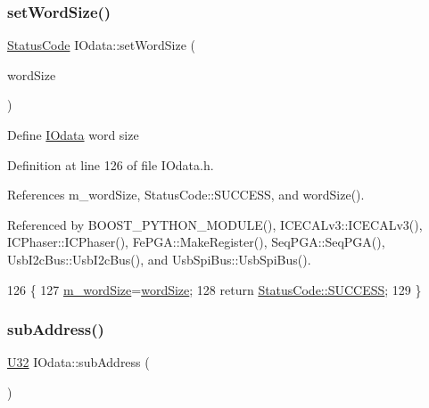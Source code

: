 \subsubsection{\texorpdfstring{set\+Word\+Size()}{setWordSize()}}
{\footnotesize\ttfamily \hyperlink{classStatusCode}{Status\+Code} I\+Odata\+::set\+Word\+Size (\begin{DoxyParamCaption}\item[{\hyperlink{classIOdata_a37c53ebf4bf8d866aac8af572962a84c}{I\+Odata\+::\+Word\+Size}}]{word\+Size }\end{DoxyParamCaption})\hspace{0.3cm}{\ttfamily [inline]}}

Define \hyperlink{classIOdata}{I\+Odata} word size 

Definition at line 126 of file I\+Odata.\+h.



References m\+\_\+word\+Size, Status\+Code\+::\+S\+U\+C\+C\+E\+SS, and word\+Size().



Referenced by B\+O\+O\+S\+T\+\_\+\+P\+Y\+T\+H\+O\+N\+\_\+\+M\+O\+D\+U\+L\+E(), I\+C\+E\+C\+A\+Lv3\+::\+I\+C\+E\+C\+A\+Lv3(), I\+C\+Phaser\+::\+I\+C\+Phaser(), Fe\+P\+G\+A\+::\+Make\+Register(), Seq\+P\+G\+A\+::\+Seq\+P\+G\+A(), Usb\+I2c\+Bus\+::\+Usb\+I2c\+Bus(), and Usb\+Spi\+Bus\+::\+Usb\+Spi\+Bus().


\begin{DoxyCode}
126                                                  \{
127     \hyperlink{classIOdata_a719b0ce607ada4fa91b12d6ecfa1b4c9}{m\_wordSize}=\hyperlink{classIOdata_a91f9e8b4095ca8365a824e43be36b143}{wordSize};
128     \textcolor{keywordflow}{return} \hyperlink{classStatusCode_a6f565cbeadc76d14c72f047e5e85eb4badd0da38d3ba0d922efd1f4619bc37ad8}{StatusCode::SUCCESS};
129   \}
\end{DoxyCode}
\mbox{\label{classIOdata_a25df48b84364a468373260f823ed9c5f}} 
\subsubsection{\texorpdfstring{sub\+Address()}{subAddress()}}
{\footnotesize\ttfamily \hyperlink{classIOdata_a96fb57f5fcd87b708743abd3c86a5198}{U32} I\+Odata\+::sub\+Address (\begin{DoxyParamCaption}{ }\end{DoxyParamCaption})\hspace{0.3cm}{\ttfamily [inline]}}


